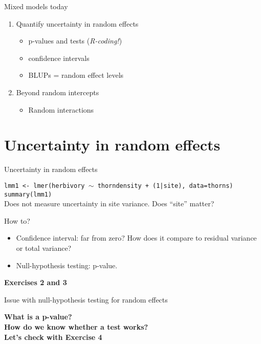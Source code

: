 \documentclass{beamer}
\begin{document}
\begin{frame}{Mixed models today}
 
 \begin{enumerate}
 \large
  \item Quantify uncertainty in random effects
    \begin{itemize}
     \item p-values and tests (\textit{R-coding!})
     \item confidence intervals
     \item BLUPs = random effect levels
    \end{itemize}
  \item Beyond random intercepts
    \begin{itemize}
     \item Random interactions
    \end{itemize}

 \end{enumerate}
 

\end{frame}

\section{Uncertainty in random effects}

\begin{frame}{Uncertainty in random effects}
 
 \texttt{lmm1 <- lmer(herbivory $\sim$ thorndensity + (1|site), data=thorns)}\\
 \texttt{summary(lmm1)}\\
 
Does not measure uncertainty in site variance. Does ``site'' matter?
 
 \pause
 \begin{exampleblock}{How to?}
 \begin{itemize}
  \item Confidence interval: far from zero? How does it compare to residual variance or total variance?
  \item Null-hypothesis testing: p-value.
 \end{itemize}
 \textbf{Exercises 2 and 3}
\end{exampleblock}
\end{frame}

\begin{frame}{Issue with null-hypothesis testing for random effects}
 
 \textbf{What is a p-value?}\\
 \pause
 \textbf{How do we know whether a test works?}\\
 
 \pause
 \vfill
 \textbf{Let's check with \color{blue} Exercise 4}
\end{frame}
\end{document}
